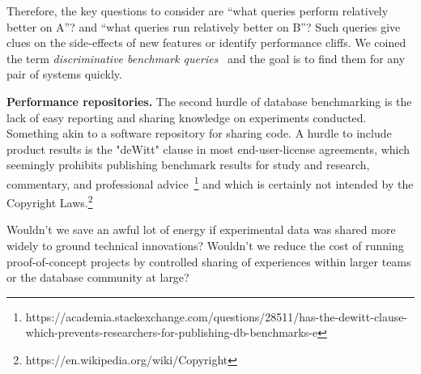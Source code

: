 \documentclass{cidr-2019}
\begin{document}
Therefore, the key questions to consider are ``what queries perform relatively
better on A''? and ``what queries run relatively better on B''? Such queries
give clues on the side-effects of new features or identify performance
cliffs. We coined the term \textit{discriminative benchmark queries}~\cite{DBLP:conf/sigmod/KerstenKZ18} and the goal is to find
them for any pair of systems quickly.


{\bf Performance repositories.}
The second hurdle of database benchmarking is the lack of easy reporting and sharing knowledge on experiments conducted. Something akin to a software repository for sharing code. 
A hurdle to include product results is the "deWitt" clause in most end-user-license agreements, which seemingly prohibits publishing benchmark results for study and research,
commentary, and professional advice~\footnote{https://academia.stackexchange.com/questions/28511/has-the-dewitt-clause-which-prevents-researchers-for-publishing-db-benchmarks-e} and which is certainly not intended by the Copyright Laws.\footnote{https://en.wikipedia.org/wiki/Copyright}

Wouldn't we save an awful lot of energy if experimental data was shared more widely to ground technical innovations?
Wouldn't we reduce the cost of running proof-of-concept projects by controlled sharing of experiences within larger teams or the database community at large?

\end{document}
